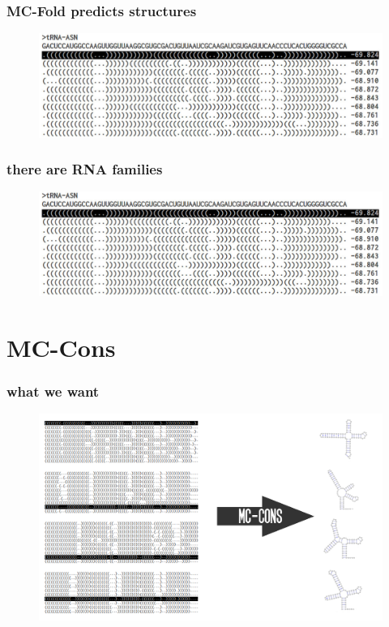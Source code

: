 \documentclass{beamer}
\begin{document}
\begin{frame}
	\frametitle{MC-Fold predicts structures}
	\begin{figure}
	\centering
	\includegraphics[scale=0.3]{figs/subopts}
	\end{figure}
\end{frame}


\begin{frame}
	\frametitle{there are RNA families}
	\begin{figure}
	\centering
	\includegraphics[scale=0.3]{figs/subopts}
	\end{figure}
\end{frame}




\section{MC-Cons}

\begin{frame}
	\frametitle{what we want}
	\begin{figure}
	\centering
	\includegraphics[scale=0.9]{figs/problem_setting}
	\end{figure}
\end{frame}
\end{document}

